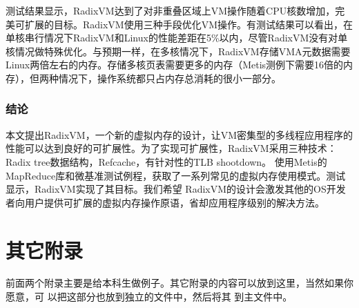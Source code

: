 测试结果显示，RadixVM达到了对非重叠区域上VM操作随着CPU核数增加，完美可扩展的目标。RadixVM使用三种手段优化VM操作。有测试结果可以看出，在单核串行情况下RadixVM和Linux的性能差距在5\%以内，尽管RadixVM没有对单核情况做特殊优化。与预期一样，在多核情况下，RadixVM存储VMA元数据需要Linux两倍左右的内存。存储多核页表需要更多的内存（Metis测例下需要16倍的内存），但两种情况下，操作系统都只占内存总消耗的很小一部分。

\subsection{结论}
本文提出RadixVM，一个新的虚拟内存的设计，让VM密集型的多线程应用程序的性能可以达到良好的可扩展性。为了实现可扩展性，RadixVM采用三种技术：Radix
tree数据结构，Refcache，有针对性的TLB
shootdown。
使用Metis的MapReduce库和微基准测试例程，获取了一系列常见的虚拟内存使用模式。测试显示，RadixVM实现了其目标。我们希望
RadixVM的设计会激发其他的OS开发者向用户提供可扩展的虚拟内存操作原语，省却应用程序级别的解决方法。


\chapter{其它附录}
前面两个附录主要是给本科生做例子。其它附录的内容可以放到这里，当然如果你愿意，可
以把这部分也放到独立的文件中，然后将其 \verb|| 到主文件中。
